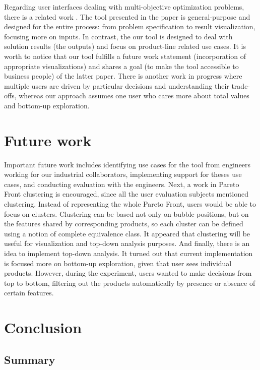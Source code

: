 \documentclass{acm_proc_article-sp}
\begin{document}
Regarding user interfaces dealing with multi-objective optimization problems, there is a related work \cite{Rayside:2009:SUI:1723028.1723037}. The tool presented in the paper is general-purpose and designed for the entire process: from problem specification to result visualization, focusing more on inputs.  In contrast, the our tool is designed to deal with solution results (the outputs) and focus on product-line related use cases. It is worth to notice that our tool fulfills a future work statement (incorporation of appropriate visualizations) and shares a goal (to make the tool accessible to business people) of the latter paper. There is another work in progress where multiple users are driven by particular decisions and understanding their trade-offs, whereas our approach assumes one user who cares more about total values and bottom-up exploration.

\section{Future work}

Important future work includes identifying use cases for the tool from engineers working for our industrial collaborators, implementing support for theses use cases, and conducting evaluation with the engineers. Next, a work in Pareto Front clustering is encouraged, since all the user evaluation subjects mentioned clustering. Instead of representing the whole Pareto Front, users would be able to focus on clusters. Clustering can be based not only on bubble positions, but on the features shared by corresponding products, so each cluster can be defined using a notion of complete equivalence class. It appeared that clustering will be useful for visualization and top-down analysis purposes. And finally, there is an idea to implement top-down analysis. It turned out that current implementation is focused more on bottom-up exploration, given that user sees individual products. However, during the experiment, users wanted to make decisions from top to bottom, filtering out the products automatically by presence or absence of certain features.

\section{Conclusion}

\subsection{Summary}
\end{document}
